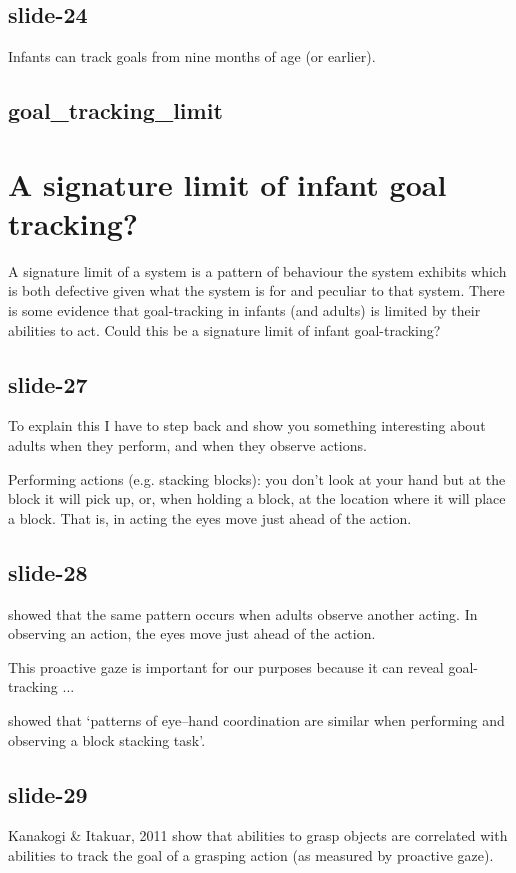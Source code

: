 \documentclass[12pt,\papersize]{extarticle}
\begin{document}
\subsection{slide-24}
Infants can track goals from nine months of age (or earlier).
 
\subsection{goal\_tracking\_limit}
 
 
\section{A signature limit of infant goal tracking?}
 
A signature limit of a system is a pattern of behaviour the system exhibits which is both defective
given what the system is for and peculiar to that system.
There is some evidence that goal-tracking 
in infants (and adults) 
is limited by their abilities to act.
Could this be a signature limit of infant goal-tracking?
 
\subsection{slide-27}
To explain this I have to step back and show you something interesting about 
adults when they perform, and when they observe actions.
 
Performing actions (e.g. stacking blocks): you don't look at your hand but at
the block it will pick up, or, when holding a block, at the location where it will place a block.
That is, in acting the eyes move just ahead of the action.
 
\subsection{slide-28}
\citet{Flanagan:2003lm} showed that the same pattern occurs when adults observe another 
acting. 
In observing an action, the eyes move just ahead of the action.
 
This proactive gaze is important for our purposes because it can reveal goal-tracking ...
 
\citet{Flanagan:2003lm} showed that 
‘patterns of eye–hand coordination are similar when performing and observing a block stacking task’.
 
\subsection{slide-29}
Kanakogi \& Itakuar, 2011 show that abilities to grasp objects are correlated with
abilities to track the goal of a grasping action (as measured by proactive gaze).
 
\end{document}

